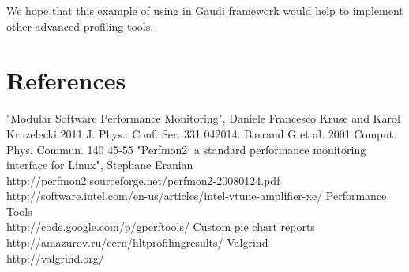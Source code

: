 \documentclass[a4paper]{jpconf}
\begin{document}
We hope that this example of using \iamp in  Gaudi framework would help to implement other advanced profiling tools.

\section*{References}
\begin{thebibliography}{9}
 "Modular Software Performance Monitoring",  Daniele Francesco Kruse and Karol Kruzelecki 2011 J. 
Phys.: Conf. Ser. 331 042014. 
 Barrand G et al. 2001 Comput. Phys. Commun. 140 45-55
 "Perfmon2: a standard performance monitoring interface for Linux", Stephane Eranian\\
http://perfmon2.sourceforge.net/perfmon2-20080124.pdf
 \iamp \\ http://software.intel.com/en-us/articles/intel-vtune-amplifier-xe/
 \google Performance Tools \\ http://code.google.com/p/gperftools/
 Custom pie chart reports \\ http://amazurov.ru/cern/hltprofilingresults/
 Valgrind \\ http://valgrind.org/
\end{thebibliography}
\end{document}
